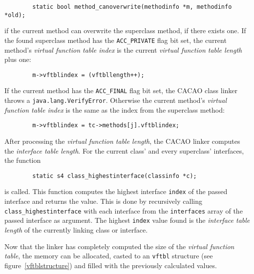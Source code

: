 \begin{verbatim}
        static bool method_canoverwrite(methodinfo *m, methodinfo *old);
\end{verbatim}

if the current method can overwrite the superclass method, if there
exists one. If the found superclass method has the
\texttt{ACC\_PRIVATE} flag bit set, the current method's
\textit{virtual function table index} is the current \textit{virtual
function table length} plus one:

\begin{verbatim}
        m->vftblindex = (vftbllength++);
\end{verbatim}

If the current method has the \texttt{ACC\_FINAL} flag bit set, the
CACAO class linker throws a \texttt{java.lang.VerifyError}. Otherwise
the current method's \textit{virtual function table index} is the same
as the index from the superclass method:

\begin{verbatim}
        m->vftblindex = tc->methods[j].vftblindex;
\end{verbatim}

After processing the \textit{virtual function table length}, the CACAO
linker computes the \textit{interface table length}. For the current
class' and every superclass' interfaces, the function

\begin{verbatim}
        static s4 class_highestinterface(classinfo *c);
\end{verbatim}

is called. This function computes the highest interface \texttt{index}
of the passed interface and returns the value. This is done by
recursively calling \texttt{class\_highestinterface} with each
interface from the \texttt{interfaces} array of the passed interface
as argument. The highest \texttt{index} value found is the
\textit{interface table length} of the currently linking class or
interface.

Now that the linker has completely computed the size of the
\textit{virtual function table}, the memory can be allocated, casted
to an \texttt{vftbl} structure (see figure~\ref{vftblstructure}) and
filled with the previously calculated values.


